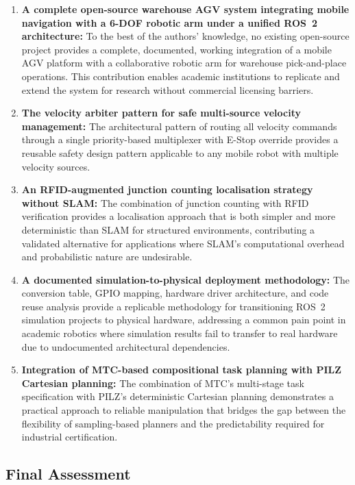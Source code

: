 \documentclass[12pt,a4paper,oneside]{report}
\begin{document}
\begin{enumerate}
\item \textbf{A complete open-source warehouse AGV system integrating mobile navigation with a 6-DOF robotic arm under a unified ROS~2 architecture:} To the best of the authors' knowledge, no existing open-source project provides a complete, documented, working integration of a mobile AGV platform with a collaborative robotic arm for warehouse pick-and-place operations. This contribution enables academic institutions to replicate and extend the system for research without commercial licensing barriers.

\item \textbf{The velocity arbiter pattern for safe multi-source velocity management:} The architectural pattern of routing all velocity commands through a single priority-based multiplexer with E-Stop override provides a reusable safety design pattern applicable to any mobile robot with multiple velocity sources.

\item \textbf{An RFID-augmented junction counting localisation strategy without SLAM:} The combination of junction counting with RFID verification provides a localisation approach that is both simpler and more deterministic than SLAM for structured environments, contributing a validated alternative for applications where SLAM's computational overhead and probabilistic nature are undesirable.

\item \textbf{A documented simulation-to-physical deployment methodology:} The conversion table, GPIO mapping, hardware driver architecture, and code reuse analysis provide a replicable methodology for transitioning ROS~2 simulation projects to physical hardware, addressing a common pain point in academic robotics where simulation results fail to transfer to real hardware due to undocumented architectural dependencies.

\item \textbf{Integration of MTC-based compositional task planning with PILZ Cartesian planning:} The combination of MTC's multi-stage task specification with PILZ's deterministic Cartesian planning demonstrates a practical approach to reliable manipulation that bridges the gap between the flexibility of sampling-based planners and the predictability required for industrial certification.
\end{enumerate}

\subsection{Final Assessment}
\end{document}
